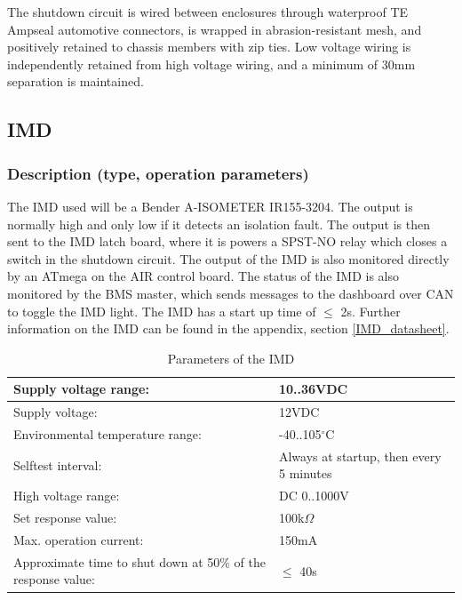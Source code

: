 \documentclass{article}
\begin{document}
The shutdown circuit is wired between enclosures through waterproof TE Ampseal automotive connectors, is wrapped in abrasion-resistant mesh, and positively retained to chassis members with zip ties. Low voltage wiring is independently retained from high voltage wiring, and a minimum of 30mm separation is maintained. 


\subsection{IMD}\label{imd}
\subsubsection{Description (type, operation parameters)}%

The IMD used will be a Bender A-ISOMETER IR155-3204. The output is normally high and only low if it detects an isolation fault. The output is then sent to the IMD latch board, where it is powers a SPST-NO relay which closes a switch in the shutdown circuit. The output of the IMD is also monitored directly by an ATmega on the AIR control board. The status of the IMD is also monitored by the BMS master, which sends messages to the dashboard over CAN to toggle the IMD light. The IMD has a start up time of $\leq$ 2s. Further information on the IMD can be found in the appendix, section \ref{IMD_datasheet}.






\begin{center}
	\begin{table}[H]
		\begin{tabular}{|l|l|}
			\hline
			Supply voltage range: &  10..36VDC \\
			\hline
			Supply voltage: &  12VDC\\
			\hline
			Environmental temperature range: &  -40..105$^{\circ}$C \\
			\hline
			Selftest interval: &  Always at startup, then every 5 minutes \\
			\hline
			High voltage range: &  DC 0..1000V \\
			\hline
			Set response value: &  100k$\Omega$ \\
			\hline
			Max. operation current: &  150mA \\
			\hline
			Approximate time to shut down at 50\% of the response value:&  $\leq$ 40s \\
			\hline
		\end{tabular}
		\caption{Parameters of the IMD}
		\label{IMDParameters}
	\end{table}
\end{center}
\end{document}
